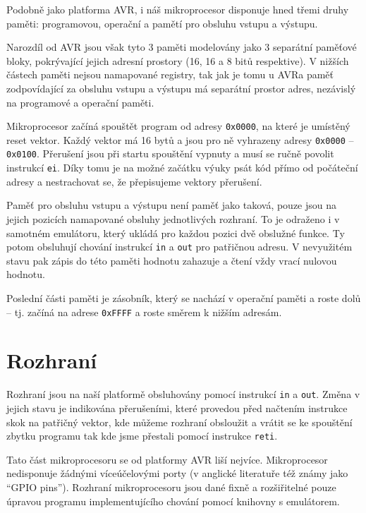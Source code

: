 Podobně jako platforma AVR\todocite, i náš mikroprocesor disponuje hned třemi druhy paměti: programovou, operační a pamětí pro obsluhu vstupu a výstupu.

Narozdíl od AVR jsou však tyto 3 paměti modelovány jako 3 separátní paměťové bloky, pokrývající jejich adresní prostory (16, 16 a 8 bitů respektive). V nižších částech paměti nejsou namapované registry, tak jak je tomu u AVR\todocite a paměť zodpovídající za obsluhu vstupu a výstupu má separátní prostor adres, nezávislý na programové a operační paměti.

Mikroprocesor začíná spouštět program od adresy \texttt{0x0000}, na které je umístěný reset vektor. Každý vektor má 16 bytů a jsou pro ně vyhrazeny adresy \texttt{0x0000} -- \texttt{0x0100}. Přerušení jsou při startu spouštění vypnuty a musí se ručně povolit instrukcí \texttt{ei}. Díky tomu je na možné začátku výuky psát kód přímo od počáteční adresy a nestrachovat se, že přepisujeme vektory přerušení.

Paměť pro obsluhu vstupu a výstupu není paměť jako taková, pouze jsou na jejich pozicích namapované obsluhy jednotlivých rozhraní. To je odraženo i v samotném emulátoru, který ukládá pro každou pozici dvě obslužné funkce. Ty potom obsluhují chování instrukcí \texttt{in} a \texttt{out} pro patřičnou adresu. V nevyužitém stavu pak zápis do této paměti hodnotu zahazuje a čtení vždy vrací nulovou hodnotu.

Poslední části paměti je zásobník, který se nachází v operační paměti a roste dolů -- tj. začíná na adrese \texttt{0xFFFF} a roste směrem k nižším adresám.

\section{Rozhraní}

Rozhraní jsou na naší platformě obsluhovány pomocí instrukcí \texttt{in} a \texttt{out}. Změna v jejich stavu je indikována přerušeními, které provedou před načtením instrukce skok na patřičný vektor, kde můžeme rozhraní obsloužit a vrátit se ke spouštění zbytku programu tak kde jsme přestali pomocí instrukce \texttt{reti}.

Tato část mikroprocesoru se od platformy AVR liší nejvíce. Mikroprocesor nedisponuje žádnými víceúčelovými porty (v anglické literatuře též známy jako ``GPIO pins''). Rozhraní mikroprocesoru jsou dané fixně a rozšiřitelné pouze úpravou programu implementujícího chování pomocí knihovny s emulátorem.

